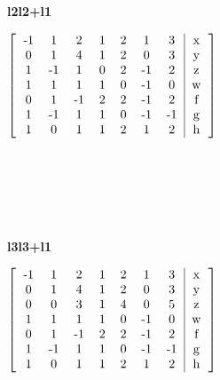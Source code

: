 \documentclass{article}
\begin{document}
\textbf{l2\rightarrow l2+l1}
\begin{hbox}{

$\left[
\begin{tabular}{ccccccc|c}
-1 & 1 & 2 & 1 & 2 & 1 & 3 & x\\
0 & 1 & 4 & 1 & 2 & 0 & 3 & y\\
1 & -1 & 1 & 0 & 2 & -1 & 2 & z\\
1 & 1 & 1 & 1 & 0 & -1 & 0 & w\\
0 & 1 & -1 & 2 & 2 & -1 & 2 & f\\
1 & -1 & 1 & 1 & 0 & -1 & -1 & g\\
1 & 0 & 1 & 1 & 2 & 1 & 2 & h\\
\end{tabular}
\right]
$}
\end{hbox}
\\\\\\\\\\
\textbf{l3\rightarrow l3+l1}
\begin{hbox}{

$\left[
\begin{tabular}{ccccccc|c}
-1 & 1 & 2 & 1 & 2 & 1 & 3 & x\\
0 & 1 & 4 & 1 & 2 & 0 & 3 & y\\
0 & 0 & 3 & 1 & 4 & 0 & 5 & z\\
1 & 1 & 1 & 1 & 0 & -1 & 0 & w\\
0 & 1 & -1 & 2 & 2 & -1 & 2 & f\\
1 & -1 & 1 & 1 & 0 & -1 & -1 & g\\
1 & 0 & 1 & 1 & 2 & 1 & 2 & h\\
\end{tabular}
\right]
$}
\end{hbox}
\\\\\\\\\\
\end{document}
